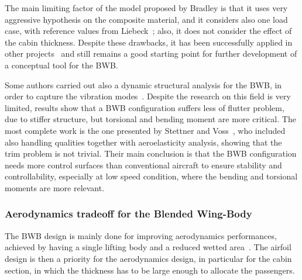 The main limiting factor of the model proposed by Bradley is that it uses very aggressive hypothesis on the composite material, and it considers also one load case, with reference values from Liebeck~\cite{bib:liebeck_2004}; also, it does not consider the effect of the cabin thickness. 
Despite these drawbacks, it has been successfully applied in other projects~\cite{bib:liu} and still remains a good starting point for further development of a conceptual tool for the BWB.

Some authors carried out also a dynamic structural analysis for the BWB, in order to capture the vibration modes~\cite{bib:yingsong, bib:weihua, bib:stroscher, bib:carlsson}.
Despite the research on this field is very limited, results show that a BWB configuration suffers less of flutter problem, due to stiffer structure, but torsional and bending moment are more critical. 
The most complete work is the one presented by Stettner and Voss~\cite{bib:stettner}, who included also handling qualities together with aeroelasticity analysis, showing that the trim problem is not trivial. 
Their main conclusion is that the BWB configuration needs more control surfaces than conventional aircraft to ensure stability and controllability, especially at low speed condition, where the bending and torsional moments are more relevant. 

\subsubsection{Aerodynamics tradeoff for the Blended Wing-Body}
\label{subsubsec:chap1_bwb_aero}

The BWB design is mainly done for improving aerodynamics performances, achieved by having a single lifting body and a reduced wetted area~\cite{bib:liebeck_1998}. 
The airfoil design is then a priority for the aerodynamics design, in particular for the cabin section, in which the thickness has to be large enough to allocate the passengers. 

